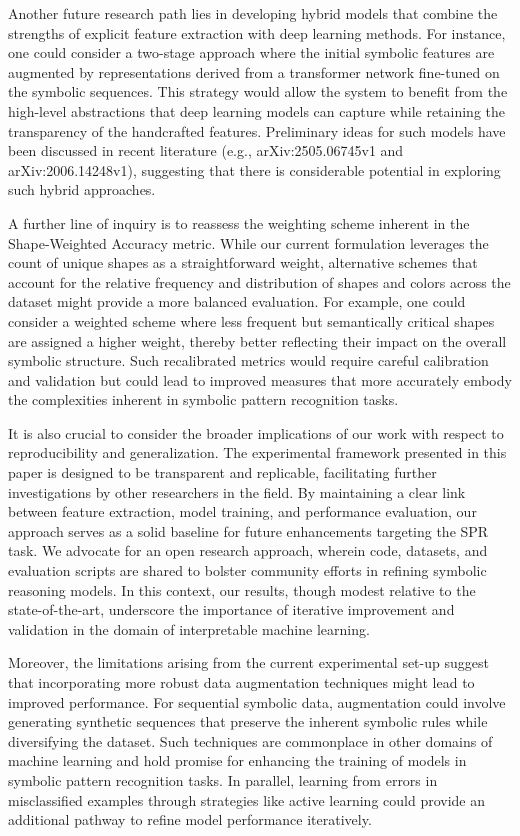 \documentclass{article}
\begin{document}
Another future research path lies in developing hybrid models that combine the strengths of explicit feature extraction with deep learning methods. For instance, one could consider a two-stage approach where the initial symbolic features are augmented by representations derived from a transformer network fine-tuned on the symbolic sequences. This strategy would allow the system to benefit from the high-level abstractions that deep learning models can capture while retaining the transparency of the handcrafted features. Preliminary ideas for such models have been discussed in recent literature (e.g., arXiv:2505.06745v1 and arXiv:2006.14248v1), suggesting that there is considerable potential in exploring such hybrid approaches.

A further line of inquiry is to reassess the weighting scheme inherent in the Shape-Weighted Accuracy metric. While our current formulation leverages the count of unique shapes as a straightforward weight, alternative schemes that account for the relative frequency and distribution of shapes and colors across the dataset might provide a more balanced evaluation. For example, one could consider a weighted scheme where less frequent but semantically critical shapes are assigned a higher weight, thereby better reflecting their impact on the overall symbolic structure. Such recalibrated metrics would require careful calibration and validation but could lead to improved measures that more accurately embody the complexities inherent in symbolic pattern recognition tasks.

It is also crucial to consider the broader implications of our work with respect to reproducibility and generalization. The experimental framework presented in this paper is designed to be transparent and replicable, facilitating further investigations by other researchers in the field. By maintaining a clear link between feature extraction, model training, and performance evaluation, our approach serves as a solid baseline for future enhancements targeting the SPR task. We advocate for an open research approach, wherein code, datasets, and evaluation scripts are shared to bolster community efforts in refining symbolic reasoning models. In this context, our results, though modest relative to the state-of-the-art, underscore the importance of iterative improvement and validation in the domain of interpretable machine learning.

Moreover, the limitations arising from the current experimental set-up suggest that incorporating more robust data augmentation techniques might lead to improved performance. For sequential symbolic data, augmentation could involve generating synthetic sequences that preserve the inherent symbolic rules while diversifying the dataset. Such techniques are commonplace in other domains of machine learning and hold promise for enhancing the training of models in symbolic pattern recognition tasks. In parallel, learning from errors in misclassified examples through strategies like active learning could provide an additional pathway to refine model performance iteratively.
\end{document}
